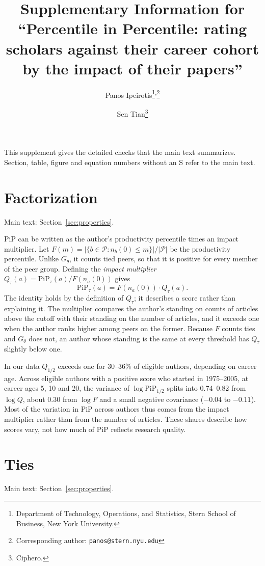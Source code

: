\documentclass[11pt]{article}
\title{Supplementary Information for ``Percentile in Percentile: rating scholars against their career
cohort by the impact of their papers''}
\author{Panos Ipeirotis\thanks{Department of Technology, Operations, and Statistics, Stern School of Business, New York University.}\textsuperscript{,}\thanks{Corresponding author: \texttt{panos@stern.nyu.edu}}
  \and Sen Tian\thanks{Ciphero.}}
\date{}
\newcommand{\PiP}{\mathrm{PiP}}
\newcommand{\Peers}{\mathcal{P}}
\begin{document}
\maketitle

\noindent This supplement gives the detailed checks that the main text summarizes. Section,
table, figure and equation numbers without an S refer to the main text.

\section{Factorization}
\label{supp:factor}
\noindent Main text: Section~\ref{sec:properties}.\par\nopagebreak

PiP can be written as the author's productivity percentile times an impact multiplier. Let
$F(m) = |\{b \in \Peers : n_b(0) \le m\}| / |\Peers|$ be the productivity percentile. Unlike $G_\theta$, it counts
tied peers, so that it is positive for every member of the peer group. Defining the \emph{impact multiplier}
$Q_\tau(a) = \PiP_\tau(a) / F(n_a(0))$ gives
\begin{equation}
\PiP_\tau(a) = F\!\left(n_a(0)\right) \cdot Q_\tau(a).
\label{eq:factor}
\end{equation}
The identity holds by the definition of $Q_\tau$; it describes a score rather than explaining it. The multiplier
compares the author's standing on counts of articles above the cutoff with their standing on the number of articles,
and it exceeds one when the author ranks higher among peers on the former. Because $F$ counts ties and $G_\theta$ does
not, an author whose standing is the same at every threshold has $Q_\tau$ slightly below one.

In our data $Q_{1/2}$ exceeds one for 30--36\% of eligible authors, depending on career age. Across eligible authors
with a positive score who started in 1975--2005, at career ages 5, 10 and 20, the variance of $\log \PiP_{1/2}$ splits
into 0.74--0.82 from $\log Q$, about 0.30 from $\log F$ and a small negative covariance ($-0.04$ to $-0.11$). Most of
the variation in PiP across authors thus comes from the impact multiplier rather than from the number of articles. These
shares describe how scores vary, not how much of PiP reflects research quality.

\section{Ties}
\label{supp:ties}
\noindent Main text: Section~\ref{sec:properties}.\par\nopagebreak
\end{document}
